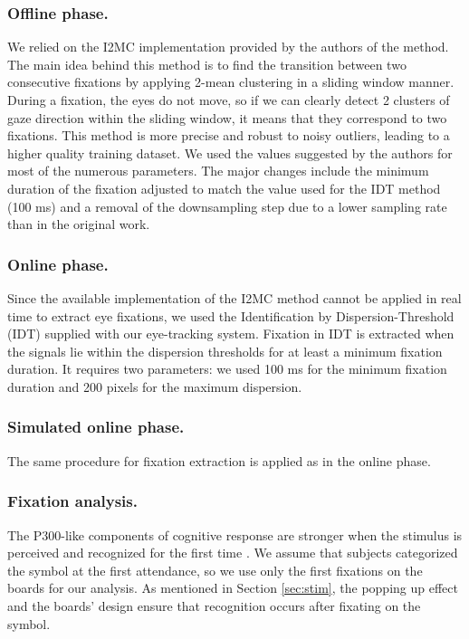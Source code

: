 \documentclass[12pt]{iopart}
\begin{document}
\subsubsection*{Offline phase.}
We relied on the I2MC implementation provided by the authors of the method.
The main idea behind this method is to find the transition between two consecutive fixations
by applying 2-mean clustering in a sliding window manner.
During a fixation, the eyes do not move, so if we can clearly detect
2 clusters of gaze direction within the sliding window,
it means that they correspond to two fixations.
This method is more precise and robust to noisy outliers, leading
to a higher quality training dataset.
We used the values suggested by the authors for most of the numerous parameters.
The major changes include the minimum duration of the fixation adjusted
to match the value used for the IDT method (100 ms) and a removal of the downsampling
step due to a lower sampling rate than in the original work.

\subsubsection*{Online phase.}
Since the available implementation of the I2MC method cannot be applied 
in real time to extract eye fixations,
we used the Identification by Dispersion-Threshold (IDT) 
supplied with our eye-tracking system. Fixation in IDT is extracted
when the signals lie within the dispersion thresholds for at least a minimum fixation duration.
It requires two parameters: we used 100 ms for the minimum fixation duration
and 200 pixels for the maximum dispersion.

\subsubsection*{Simulated online phase.}
The same procedure for fixation extraction is applied as in the online phase.

\subsubsection*{Fixation analysis.}
\label{sec:fixanal}
The P300-like components of cognitive response are stronger when the stimulus is perceived and recognized
for the first time \cite{devillez_p300_2015}. 
We assume that subjects categorized the symbol at the first
attendance, so we use only the first fixations on the boards for our analysis.
As mentioned in Section \ref{sec:stim}, the popping up effect  
and the boards' design ensure that
recognition occurs after fixating on the symbol.
\end{document}
